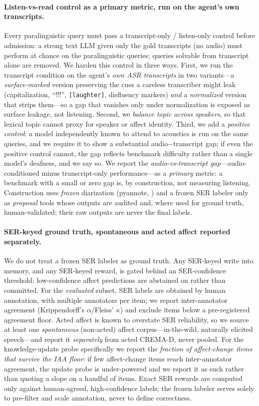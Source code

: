 \paragraph{Listen-vs-read control as a primary metric, run on the agent's own transcripts.} Every paralinguistic query must pass a transcript-only / listen-only control before admission: a strong text LLM given only the gold transcripts (no audio) must perform at chance on the paralinguistic queries; queries solvable from transcript alone are removed. We harden this control in three ways. First, we run the transcript condition on the agent's \emph{own ASR transcripts} in two variants---a \emph{surface-marked} version preserving the cues a careless transcriber might leak (capitalization, ``!!!'', \texttt{[laughter]}, disfluency markers) \emph{and} a \emph{normalized} version that strips them---so a gap that vanishes only under normalization is exposed as surface leakage, not listening. Second, we \emph{balance topic across speakers}, so that lexical topic cannot proxy for speaker or affect identity. Third, we add a \emph{positive control}: a model independently known to attend to acoustics is run on the same queries, and we require it to show a substantial audio$-$transcript gap; if even the positive control cannot, the gap reflects benchmark difficulty rather than a single model's deafness, and we say so. We report the \emph{audio-vs-transcript gap}---audio-conditioned minus transcript-only performance---as a \emph{primary} metric: a benchmark with a small or zero gap is, by construction, not measuring listening. Construction uses \emph{frozen} diarization (pyannote, \citealp{pyannotecode,personalvad2019,xvector2021}) and a frozen SER labeler only as \emph{proposal} tools whose outputs are audited and, where used for ground truth, human-validated; their raw outputs are never the final labels.

\paragraph{SER-keyed ground truth, spontaneous and acted affect reported separately.} We do not treat a frozen SER labeler as ground truth. Any SER-keyed write into memory, and any SER-keyed reward, is gated behind an SER-confidence threshold: low-confidence affect predictions are abstained on rather than committed. For the \emph{evaluated} subset, SER labels are obtained by human annotation, with multiple annotators per item; we report inter-annotator agreement (Krippendorff's $\alpha$/Fleiss' $\kappa$) and exclude items below a pre-registered agreement floor. Acted affect is known to overstate SER reliability, so we source at least one \emph{spontaneous} (non-acted) affect corpus---in-the-wild, naturally elicited speech---and report it \emph{separately} from acted CREMA-D, never pooled. For the knowledge-update probe specifically we report the \emph{fraction of affect-change items that survive the IAA floor}: if few affect-change items reach inter-annotator agreement, the update probe is under-powered and we report it as such rather than quoting a slope on a handful of items. Exact SER rewards are computed only against human-agreed, high-confidence labels; the frozen labeler serves solely to pre-filter and scale annotation, never to define correctness.

